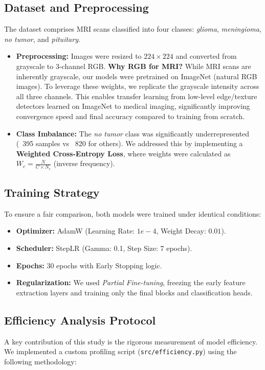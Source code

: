\documentclass[12pt, a4paper]{article}
\begin{document}
\subsection{Dataset and Preprocessing}
The dataset comprises MRI scans classified into four classes: \textit{glioma}, \textit{meningioma}, \textit{no tumor}, and \textit{pituitary}.
\begin{itemize}
    \item \textbf{Preprocessing:} Images were resized to $224 \times 224$ and converted from grayscale to 3-channel RGB. \textbf{Why RGB for MRI?} While MRI scans are inherently grayscale, our models were pretrained on ImageNet (natural RGB images). To leverage these weights, we replicate the grayscale intensity across all three channels. This enables transfer learning from low-level edge/texture detectors learned on ImageNet to medical imaging, significantly improving convergence speed and final accuracy compared to training from scratch.
    \item \textbf{Class Imbalance:} The \textit{no tumor} class was significantly underrepresented (~395 samples vs ~820 for others). We addressed this by implementing a \textbf{Weighted Cross-Entropy Loss}, where weights were calculated as $W_c = \frac{N}{C \times N_c}$ (inverse frequency).
\end{itemize}

\subsection{Training Strategy}
To ensure a fair comparison, both models were trained under identical conditions:
\begin{itemize}
    \item \textbf{Optimizer:} AdamW (Learning Rate: $1e-4$, Weight Decay: $0.01$).
    \item \textbf{Scheduler:} StepLR (Gamma: 0.1, Step Size: 7 epochs).
    \item \textbf{Epochs:} 30 epochs with Early Stopping logic.
    \item \textbf{Regularization:} We used \textit{Partial Fine-tuning}, freezing the early feature extraction layers and training only the final blocks and classification heads.
\end{itemize}

\subsection{Efficiency Analysis Protocol}
A key contribution of this study is the rigorous measurement of model efficiency. We implemented a custom profiling script (\texttt{src/efficiency.py}) using the following methodology:
\end{document}
